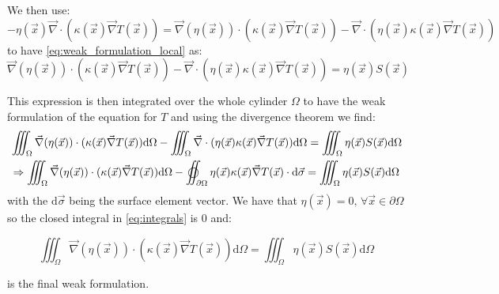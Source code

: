 We then use:
\begin{equation}
    -\eta(\vec{x})\vec{\nabla}\cdot(\kappa(\vec{x})\vec{\nabla}T(\vec{x})) = \vec{\nabla}(\eta(\vec{x}))\cdot(\kappa(\vec{x})\vec{\nabla}T(\vec{x})) - \vec{\nabla}\cdot(\eta(\vec{x})\kappa(\vec{x})\vec{\nabla}T(\vec{x}))
\end{equation}
to have \autoref{eq:weak_formulation_local} as:
\begin{equation}
    \vec{\nabla}(\eta(\vec{x}))\cdot(\kappa(\vec{x})\vec{\nabla}T(\vec{x})) - \vec{\nabla}\cdot(\eta(\vec{x})\kappa(\vec{x})\vec{\nabla}T(\vec{x})) = \eta(\vec{x})S(\vec{x})
\end{equation}

This expression is then integrated over the whole cylinder $\Omega$ to have the weak formulation of the equation for $T$ and using the divergence theorem we find:
\begin{equation}
    \begin{aligned}
        & \iiint_\Omega \vec{\nabla}(\eta(\vec{x}))\cdot(\kappa(\vec{x})\vec{\nabla}T(\vec{x})) \mathrm{d}\Omega - \iiint_\Omega \vec{\nabla}\cdot(\eta(\vec{x})\kappa(\vec{x})\vec{\nabla}T(\vec{x})) \mathrm{d}\Omega = \iiint_\Omega \eta(\vec{x})S(\vec{x}) \mathrm{d}\Omega \\
        & \Rightarrow \iiint_\Omega \vec{\nabla}(\eta(\vec{x}))\cdot(\kappa(\vec{x})\vec{\nabla}T(\vec{x})) \mathrm{d}\Omega - \varoiint_{\partial\Omega} \eta(\vec{x})\kappa(\vec{x})\vec{\nabla}T(\vec{x}) \cdot \mathrm{d}\vec{\sigma} = \iiint_\Omega \eta(\vec{x})S(\vec{x}) \mathrm{d}\Omega
    \end{aligned}
    \label{eq:integrals}
\end{equation}
with the $\mathrm{d}\vec{\sigma}$ being the surface element vector. We have that $\eta(\vec{x}) = 0, \, \forall \vec{x} \in \partial\Omega$ so the closed integral in \autoref{eq:integrals} is 0 and:

\begin{equation}
    \iiint_\Omega \vec{\nabla}(\eta(\vec{x}))\cdot(\kappa(\vec{x})\vec{\nabla}T(\vec{x})) \mathrm{d}\Omega = \iiint_\Omega \eta(\vec{x})S(\vec{x}) \mathrm{d}\Omega
    \label{eq:weak_formulation}
\end{equation}

is the final weak formulation.

